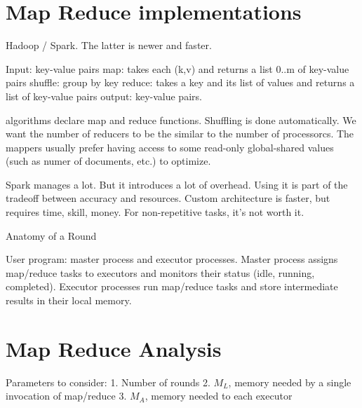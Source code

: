 \documentclass[a4paper]{tufte-handout} %
\begin{document}
\section{Map Reduce implementations}

Hadoop / Spark. The latter is newer and faster. 

Input: key-value pairs
map: takes each (k,v) and returns a list 0..m of key-value pairs
shuffle: group by key
reduce: takes a key and its list of values and returns a list of key-value pairs
output: key-value pairs.

algorithms declare map and reduce functions. Shuffling is done automatically.
We want the number of reducers to be the similar to the number of processorcs.
The mappers usually prefer having access to some read-only global-shared values (such as numer of documents, etc.) to optimize.

Spark manages a lot. But it introduces a lot of overhead. Using it is part of the tradeoff between accuracy and resources.
Custom architecture is faster, but requires time, skill, money. For non-repetitive tasks, it's not worth it.

Anatomy of a Round

User program: master process and executor processes.
Master process assigns map/reduce tasks to executors and monitors their status (idle, running, completed).
Executor processes run map/reduce tasks and store intermediate results in their local memory.

\section{Map Reduce Analysis}

Parameters to consider:
1. Number of rounds
2. $M_L$, memory needed by a single invocation of map/reduce
3. $M_A$, memory needed to each executor


\newpage



\end{document}
